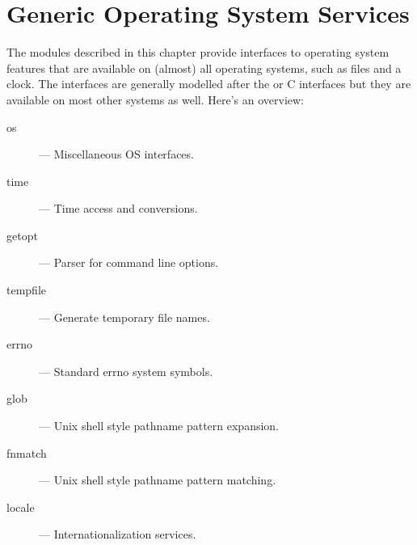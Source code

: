 \chapter{Generic Operating System Services}

The modules described in this chapter provide interfaces to operating
system features that are available on (almost) all operating systems,
such as files and a clock.  The interfaces are generally modelled
after the \UNIX{} or C interfaces but they are available on most other
systems as well.  Here's an overview:

\begin{description}

\item[os]
--- Miscellaneous OS interfaces.

\item[time]
--- Time access and conversions.

\item[getopt]
--- Parser for command line options.

\item[tempfile]
--- Generate temporary file names.

\item[errno]
--- Standard errno system symbols.

\item[glob]
--- Unix shell style pathname pattern expansion.

\item[fnmatch]
--- Unix shell style pathname pattern matching.

\item[locale]
--- Internationalization services.

\end{description}
